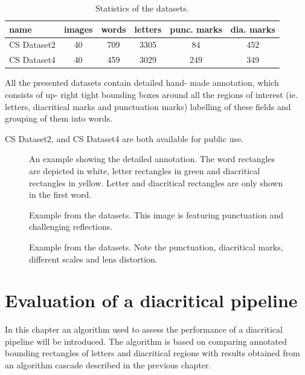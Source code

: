\documentclass[12pt,a4paper]{report}
\begin{document}
\begin{table}[htbp]
    \centering
    \begin{tabular}{lccccc}
        \toprule
        name & images & words & letters & punc. marks & dia. marks \\
        \midrule
        CS Dataset2 & 40 & 709 & 3305 & 84 & 452 \\
        CS Dataset4 & 40 & 459 & 3029 & 249 & 349 \\
        \bottomrule
    \end{tabular}
    \caption{Statistics of the datasets.}
    \label{tab:dataset-stats}
\end{table}

All the presented datasets contain detailed hand- made annotation, which consists of up- right tight bounding boxes around all the regions of interest (ie. letters, diacritical marks and punctuation marks) labelling of these fields and grouping of them into words.

CS Dataset2, and CS Dataset4 are both available for public use.

\begin{figure}[htbp]
    \centering
    \caption{An example showing the detailed annotation. The word rectangles are depicted in white, letter rectangles in green and diacritical rectangles in yellow. Letter and diacritical rectangles are only shown in the first word.}
    \label{fig:annotation-example}
\end{figure}

\begin{figure}[htbp]
    \centering
    \caption{Example from the datasets. This image is featuring punctuation and challenging reflections.}
    \label{fig:dataset-example1}
\end{figure}

\begin{figure}[htbp]
    \centering
    \caption{Example from the datasets. Note the punctuation, diacritical marks, different scales and lens distortion.}
    \label{fig:dataset-example2}
\end{figure}

\chapter{Evaluation of a diacritical pipeline}
In this chapter an algorithm used to assess the performance of a diacritical pipeline will be introduced. The algorithm is based on comparing annotated bounding rectangles of letters and diacritical regions with results obtained from an algorithm cascade described in the previous chapter.
\end{document}
